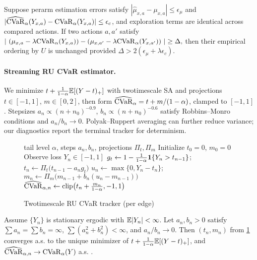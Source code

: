 \begin{proposition}
Suppose per\textendash arm estimation errors satisfy $|\hat\mu_{x,a}-\mu_{x,a}|\le \epsilon_\mu$ and $|\widehat{\mathrm{CVaR}}_\alpha(Y_{x,a})-\mathrm{CVaR}_\alpha(Y_{x,a})|\le \epsilon_c$, and exploration terms are identical across compared actions. If two actions $a,a'$ satisfy
$
|\ (\mu_{x,a}-\lambda \mathrm{CVaR}_\alpha(Y_{x,a}))-(\mu_{x,a'}-\lambda \mathrm{CVaR}_\alpha(Y_{x,a'}))\ |\ge \Delta,
$
then their empirical ordering by $U$ is unchanged provided $\Delta>2(\epsilon_\mu+\lambda \epsilon_c)$.
\end{proposition}

\paragraph{Streaming RU CVaR estimator.}
We minimize $t+\frac{1}{1-\alpha}\mathbb{E}[(Y-t)_+]$ with two\textendash timescale SA and projections $t\in[-1,1]$, $m\in[0,2]$, then form $\widehat{\mathrm{CVaR}}_\alpha=t+m/(1-\alpha)$, clamped to $[-1,1]$. Stepsizes $a_n\propto (n+n_0)^{-0.9}$, $b_n\propto (n+n_0)^{-0.6}$ satisfy Robbins--Monro conditions and $a_n/b_n\to 0$. Polyak–Ruppert averaging \cite{polyak1992averaging} can further reduce variance; our diagnostics report the terminal tracker for determinism.

\begin{figure}[t]
\centering
\begin{adjustbox}{width=\linewidth}
\begin{minipage}{\linewidth}
\begin{algorithm}[H]
\caption{Two\textendash timescale RU CVaR tracker (per edge)}
\label{alg:cvar}
\begin{algorithmic}[1]
\Require tail level $\alpha$, steps $a_n,b_n$, projections $\Pi_t,\Pi_m$
\State Initialize $t_0=0$, $m_0=0$
  \State Observe loss $Y_n\in[-1,1]$
  \State $g_t \gets 1-\frac{1}{1-\alpha}\mathbf{1}\{Y_n>t_{n-1}\}$; $t_n\gets \Pi_t\big(t_{n-1}-a_n g_t\big)$
  \State $u_n\gets \max\{0,Y_n-t_n\}$; $m_n\gets \Pi_m\big(m_{n-1}+b_n(u_n-m_{n-1})\big)$
  \State $\widehat{\mathrm{CVaR}}_{\alpha,n}\gets \mathrm{clip}\big(t_n+\frac{m_n}{1-\alpha},-1,1\big)$
\EndFor
\end{algorithmic}
\end{algorithm}
\end{minipage}
\end{adjustbox}
\end{figure}

\begin{proposition}\label{prop:sa}
Assume $\{Y_n\}$ is stationary ergodic with $\mathbb{E}|Y_n|<\infty$. Let $a_n,b_n>0$ satisfy $\sum a_n=\sum b_n=\infty$, $\sum (a_n^2+b_n^2)<\infty$, and $a_n/b_n\to 0$. Then $(t_n,m_n)$ from \cref{alg:cvar} converges a.s. to the unique minimizer of $t+\frac{1}{1-\alpha}\mathbb{E}[(Y-t)_+]$, and $\widehat{\mathrm{CVaR}}_{\alpha,n}\to \mathrm{CVaR}_\alpha(Y)$ a.s. \cite{rockafellar2000cvar,borkar2008sa,kushner2003sa}.
\end{proposition}

